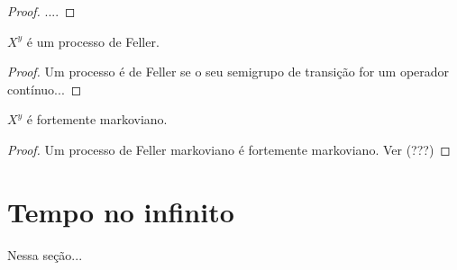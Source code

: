 \begin{proof}
  ....
\end{proof}

\begin{proposicao}
  \label{prop:proc_feller}
  $X^y$ é um processo de Feller.
\end{proposicao}
\begin{proof}
  Um processo é de Feller se o seu semigrupo de transição for um
  operador contínuo...
\end{proof}



\begin{corolario}
  \label{cor:proc_fort_markov}
  $X^y$ é fortemente markoviano.
\end{corolario}
\begin{proof}
  Um processo de Feller markoviano é fortemente markoviano. Ver (???)
\end{proof}





\section{Tempo no infinito}
\label{sec:tempo-infinito}


Nessa seção...


